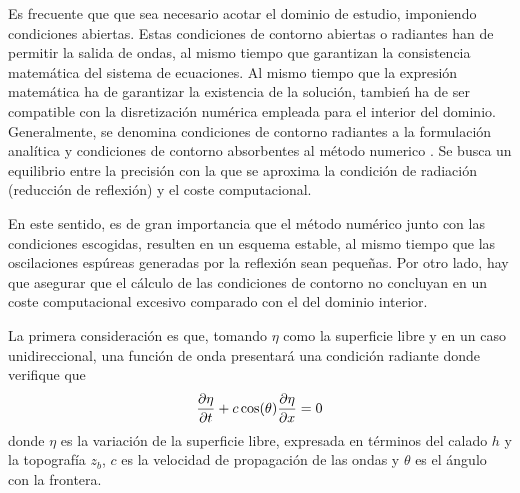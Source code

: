 Es frecuente que que sea necesario acotar el dominio de estudio, imponiendo condiciones abiertas. Estas condiciones de contorno abiertas o radiantes han de permitir la salida de ondas, al mismo tiempo que garantizan la consistencia matemática del sistema de ecuaciones. Al mismo tiempo que la expresión matemática ha de garantizar la existencia de la solución, tambień ha de ser compatible con la disretización numérica empleada para el interior del dominio. Generalmente, se denomina condiciones de contorno radiantes a la formulación analítica y condiciones de contorno absorbentes al método numerico \cite{navon2004}.
Se busca un equilibrio entre la precisión con la que se aproxima la condición de radiación (reducción de reflexión) y el coste computacional.

En este sentido, es de gran importancia que el método numérico junto con las condiciones escogidas, resulten en un esquema estable, al mismo tiempo que las oscilaciones espúreas generadas por la reflexión sean pequeñas.
Por otro lado, hay que asegurar que el cálculo de las condiciones de contorno no concluyan en un coste computacional excesivo comparado con el del dominio interior.

La primera consideración es que, tomando $\eta$ como la superficie libre y en un caso unidireccional, una función de onda presentará una condición radiante donde verifique que
\begin{equation} \label{radiation_condition}
    \frac{\partial\eta}{\partial t} + c \cos(\theta)\frac{\partial\eta}{\partial x} = 0
\end{equation}
donde $\eta$ es la variación de la superficie libre, expresada en términos del calado $h$ y la topografía $z_b$, $c$ es la velocidad de propagación de las ondas y $\theta$ es el ángulo con la frontera.

